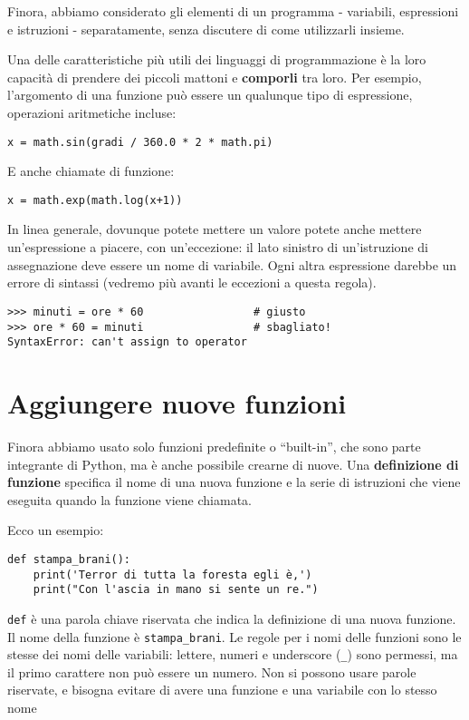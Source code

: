 \documentclass[10pt]{book}
\begin{document}
Finora, abbiamo considerato gli elementi di un programma - variabili, espressioni e istruzioni - separatamente, senza discutere di come utilizzarli insieme.

Una delle caratteristiche più utili dei linguaggi di programmazione è la loro capacità di prendere dei piccoli mattoni e {\bf comporli} tra loro. Per esempio, l'argomento di una funzione può essere un qualunque tipo di espressione, operazioni aritmetiche incluse:

\begin{verbatim}
x = math.sin(gradi / 360.0 * 2 * math.pi)
\end{verbatim}
%
E anche chiamate di funzione:

\begin{verbatim}
x = math.exp(math.log(x+1))
\end{verbatim}
%
In linea generale, dovunque potete mettere un valore potete anche mettere un'espressione a piacere, con un'eccezione: il lato sinistro di un'istruzione di assegnazione deve essere un nome di variabile. Ogni altra espressione darebbe un errore di sintassi (vedremo più avanti le eccezioni a questa regola).

\begin{verbatim}
>>> minuti = ore * 60                 # giusto
>>> ore * 60 = minuti                 # sbagliato!
SyntaxError: can't assign to operator
\end{verbatim}
%


\section{Aggiungere nuove funzioni}

Finora abbiamo usato solo funzioni predefinite o ``built-in'', che sono parte integrante di Python, ma è anche possibile crearne di nuove.
Una {\bf definizione di funzione} specifica il nome di una nuova funzione e la serie di istruzioni che viene eseguita quando la funzione viene chiamata.

Ecco un esempio:

\begin{verbatim}
def stampa_brani():
    print('Terror di tutta la foresta egli è,')
    print("Con l'ascia in mano si sente un re.")
\end{verbatim}
%
{\tt def} è una parola chiave riservata che indica la definizione di una nuova funzione. Il nome della funzione è \verb"stampa_brani".  Le regole per i nomi delle funzioni sono le stesse dei nomi delle variabili: lettere, numeri e underscore (\verb"_") sono permessi, ma il primo carattere non può essere un numero. Non si possono usare parole riservate, e bisogna evitare di avere una funzione e una variabile con lo stesso nome
\end{document}
